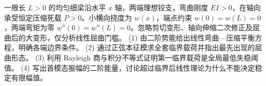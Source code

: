 一根长 \(L>0\) 的均匀细梁沿水平 \(x\) 轴，两端理想铰支，弯曲刚度 \(EI>0\)，在轴向承受恒定压缩死载 \(P>0\)。小横向挠度为 \(w(x)\)，端点约束 \(w(0)=w(L)=0\)，两端弯矩为零 \(w''(0)=w''(L)=0\)。忽略剪切变形、轴向伸缩二次修正及屈曲后的大变形，仅分析线性屈曲门槛。
(1) 由二阶势能给出线性弯曲—压缩平衡方程，明确各端边界条件。
(2) 通过正弦本征模求全套临界载荷并指出最先出现的屈曲形态。
(3) 利用 Rayleigh 商与积分不等式证明第一临界载荷是全局最低失稳阈值。
(4) 写出首模态振幅的二阶能量，讨论超过临界后线性理论为什么不能决定稳定有限幅值。
